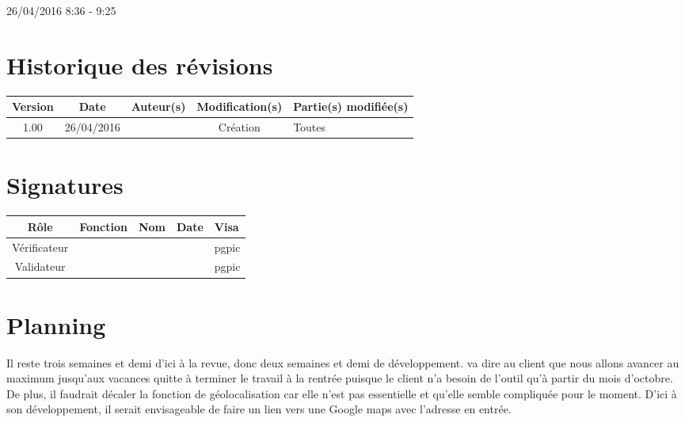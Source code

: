 \documentclass [a4paper] {article}
\begin{document}
26/04/2016			 				%
\hfill   
\hfill 	 8:36 - 9:25				%



\section*{Historique des révisions}
\begin{center}
			\begin{tabular}{| c | c | c | c | p{4cm} |}
				\hline
				\rowcolor{Gray}
				Version & Date & Auteur(s) & Modification(s) & Partie(s) modifiée(s)		 \\
				\hline
				1.00 & 26/04/2016 & \Pierre & Création & Toutes \\
		\hline		
			\end{tabular}
		\end{center}

\section*{Signatures}

		\begin{center}
			\begin{tabular}{| c | c | c | c | p{4cm} |}
				\hline
				\rowcolor{Gray}
				Rôle & Fonction & Nom & Date & Visa		 \\
				\hline
				Vérificateur & \RQA & \Kafui &  & pgpic \\[30pt]
				\hline
				Validateur & \CP & \Sergi &  & pgpic \\[30pt]	
				\hline
			\end{tabular}
		\end{center}


\section{Planning}
Il reste trois semaines et demi d'ici à la revue, donc deux semaines et demi de développement. \Sergi{} va dire au client que nous allons avancer au maximum jusqu'aux vacances quitte à terminer le travail à la rentrée puisque le client n'a besoin de l'outil qu'à partir du mois d'octobre. De plus, il faudrait décaler la fonction de géolocalisation car elle n'est pas essentielle et qu'elle semble compliquée pour le moment. D'ici à son développement, il serait envisageable de faire un lien vers une Google maps avec l'adresse en entrée.
\end{document}
